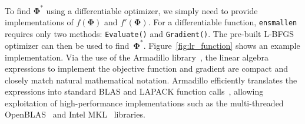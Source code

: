 \documentclass[twoside,11pt]{article}
\begin{document}

To find $\bm \Phi^*$ using a differentiable optimizer,
we simply need to provide implementations of $f(\bm \Phi)$ and $f'(\bm \Phi)$.
For a differentiable function, {\tt ensmallen} requires only two methods:
{\tt Evaluate()} and {\tt Gradient()}.
The pre-built L-BFGS optimizer can then be used to find~$\bm \Phi^*$.
Figure~\ref{fig:lr_function} shows an example implementation.
Via the use of the Armadillo library~\citep{sanderson2016armadillo},
the linear algebra expressions to implement the objective function and gradient
are compact and closely match natural mathematical notation.
Armadillo efficiently translates the expressions into standard BLAS and LAPACK function calls~\citep{anderson1999lapack},
allowing exploitation of high-performance implementations such as the multi-threaded \mbox{OpenBLAS}~\citep{OpenBLAS} and Intel MKL~\citep{IntelMKL} libraries.






\end{document}

